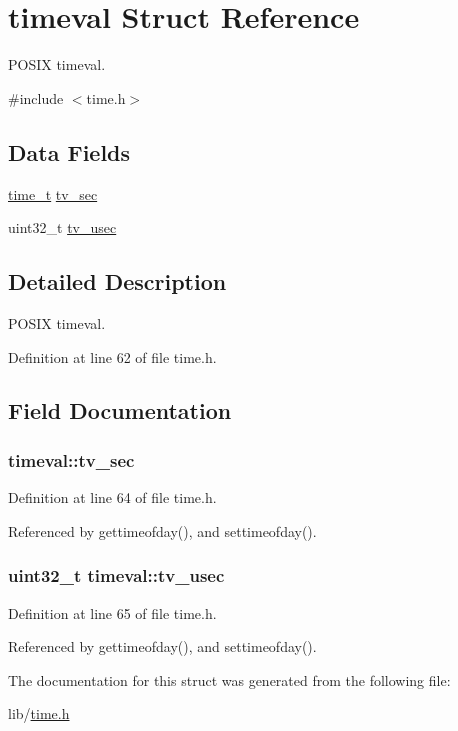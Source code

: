 \hypertarget{structtimeval}{\section{timeval Struct Reference}
\label{structtimeval}
}


P\-O\-S\-I\-X timeval.  




{\ttfamily \#include $<$time.\-h$>$}

\subsection*{Data Fields}
\begin{DoxyCompactItemize}
\item 
\hyperlink{posix_8h_a3346b04b0420b32ccf6b706551b70762}{time\-\_\-t} \hyperlink{structtimeval_aef6ddab1064c430758f9f913b7e4a21e}{tv\-\_\-sec}
\item 
uint32\-\_\-t \hyperlink{structtimeval_a8fd7abf5420981b3ff58bb23df458587}{tv\-\_\-usec}
\end{DoxyCompactItemize}


\subsection{Detailed Description}
P\-O\-S\-I\-X timeval. 

Definition at line 62 of file time.\-h.



\subsection{Field Documentation}
\hypertarget{structtimeval_aef6ddab1064c430758f9f913b7e4a21e}{
\subsubsection[{tv\-\_\-sec}]{ timeval\-::tv\-\_\-sec}}\label{structtimeval_aef6ddab1064c430758f9f913b7e4a21e}


Definition at line 64 of file time.\-h.



Referenced by gettimeofday(), and settimeofday().

\hypertarget{structtimeval_a8fd7abf5420981b3ff58bb23df458587}{
\subsubsection[{tv\-\_\-usec}]{\setlength{\rightskip}{0pt plus 5cm}uint32\-\_\-t timeval\-::tv\-\_\-usec}}\label{structtimeval_a8fd7abf5420981b3ff58bb23df458587}


Definition at line 65 of file time.\-h.



Referenced by gettimeofday(), and settimeofday().



The documentation for this struct was generated from the following file\-:\begin{DoxyCompactItemize}
\item 
lib/\hyperlink{time_8h}{time.\-h}\end{DoxyCompactItemize}
